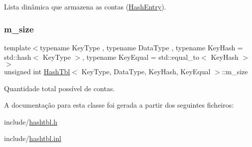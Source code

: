 Lista dinâmica que armazena as contas (\hyperlink{classHashEntry}{Hash\+Entry}). 

\mbox{\label{classHashTbl_acb5d99413eab0f528c43c01186ac7276}} 
\subsubsection{\texorpdfstring{m\+\_\+size}{m\_size}}
{\footnotesize\ttfamily template$<$typename Key\+Type , typename Data\+Type , typename Key\+Hash  = std\+::hash$<$ Key\+Type $>$, typename Key\+Equal  = std\+::equal\+\_\+to$<$ Key\+Hash $>$$>$ \\
unsigned int \hyperlink{classHashTbl}{Hash\+Tbl}$<$ Key\+Type, Data\+Type, Key\+Hash, Key\+Equal $>$\+::m\+\_\+size\hspace{0.3cm}{\ttfamily [private]}}



Quantidade total possível de contas. 



A documentação para esta classe foi gerada a partir dos seguintes ficheiros\+:\begin{DoxyCompactItemize}
\item 
include/\hyperlink{hashtbl_8h}{hashtbl.\+h}\item 
include/\hyperlink{hashtbl_8inl}{hashtbl.\+inl}\end{DoxyCompactItemize}
